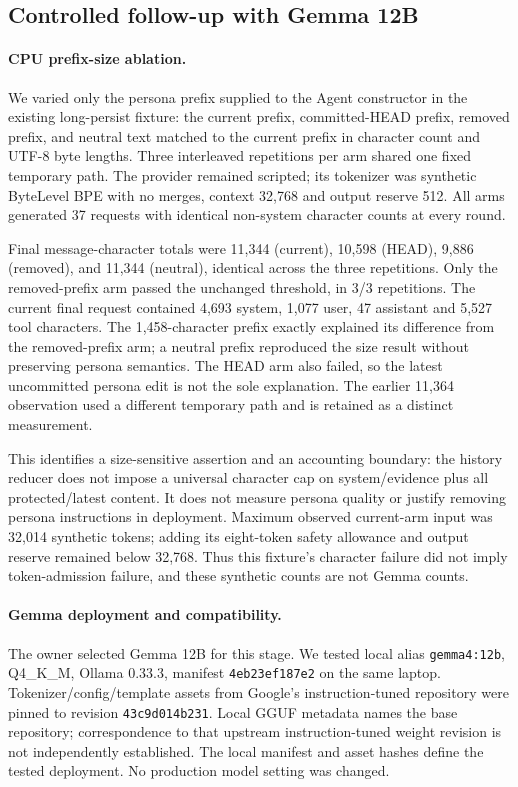 \documentclass[11pt,a4paper]{article}
\begin{document}
\subsection{Controlled follow-up with Gemma 12B}\label{sec:followup}
\paragraph{CPU prefix-size ablation.}
We varied only the persona prefix supplied to the Agent constructor in the existing long-persist fixture: the current prefix, committed-HEAD prefix, removed prefix, and neutral text matched to the current prefix in character count and UTF-8 byte lengths. Three interleaved repetitions per arm shared one fixed temporary path. The provider remained scripted; its tokenizer was synthetic ByteLevel BPE with no merges, context 32,768 and output reserve 512. All arms generated 37 requests with identical non-system character counts at every round.

Final message-character totals were 11,344 (current), 10,598 (HEAD), 9,886 (removed), and 11,344 (neutral), identical across the three repetitions. Only the removed-prefix arm passed the unchanged threshold, in 3/3 repetitions. The current final request contained 4,693 system, 1,077 user, 47 assistant and 5,527 tool characters. The 1,458-character prefix exactly explained its difference from the removed-prefix arm; a neutral prefix reproduced the size result without preserving persona semantics. The HEAD arm also failed, so the latest uncommitted persona edit is not the sole explanation. The earlier 11,364 observation used a different temporary path and is retained as a distinct measurement.

This identifies a size-sensitive assertion and an accounting boundary: the history reducer does not impose a universal character cap on system/evidence plus all protected/latest content. It does not measure persona quality or justify removing persona instructions in deployment. Maximum observed current-arm input was 32,014 synthetic tokens; adding its eight-token safety allowance and output reserve remained below 32,768. Thus this fixture's character failure did not imply token-admission failure, and these synthetic counts are not Gemma counts.

\paragraph{Gemma deployment and compatibility.}
The owner selected Gemma 12B for this stage. We tested local alias \texttt{gemma4:12b}, Q4\_K\_M, Ollama 0.33.3, manifest \texttt{4eb23ef187e2} on the same laptop. Tokenizer/config/template assets from Google's instruction-tuned repository \cite{gemmaassets} were pinned to revision \texttt{43c9d014b231}. Local GGUF metadata names the base repository; correspondence to that upstream instruction-tuned weight revision is not independently established. The local manifest and asset hashes define the tested deployment. No production model setting was changed.
\end{document}
